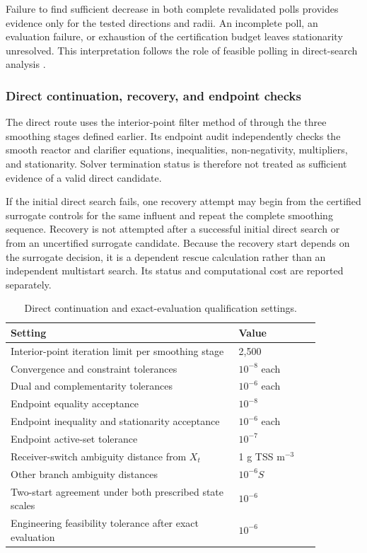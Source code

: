 Failure to find sufficient decrease in both complete revalidated polls provides evidence only for the tested directions and radii. An incomplete poll, an evaluation failure, or exhaustion of the certification budget leaves stationarity unresolved. This interpretation follows the role of feasible polling in direct-search analysis \citep{AudetDennis2006}.

\subsubsection{Direct continuation, recovery, and endpoint checks}

The direct route uses the interior-point filter method of \citet{WachterBiegler2006} through the three smoothing stages defined earlier. Its endpoint audit independently checks the smooth reactor and clarifier equations, inequalities, non-negativity, multipliers, and stationarity. Solver termination status is therefore not treated as sufficient evidence of a valid direct candidate.

If the initial direct search fails, one recovery attempt may begin from the certified surrogate controls for the same influent and repeat the complete smoothing sequence. Recovery is not attempted after a successful initial direct search or from an uncertified surrogate candidate. Because the recovery start depends on the surrogate decision, it is a dependent rescue calculation rather than an independent multistart search. Its status and computational cost are reported separately.

\begin{table}[htbp]
\centering\small
\caption{Direct continuation and exact-evaluation qualification settings.}\label{tab:plant_direct_settings}
\begin{tabular}{p{0.64\linewidth}p{0.23\linewidth}}
\toprule Setting & Value\\\midrule
Interior-point iteration limit per smoothing stage & 2{,}500\\
Convergence and constraint tolerances & $10^{-8}$ each\\
Dual and complementarity tolerances & $10^{-6}$ each\\
Endpoint equality acceptance & $10^{-8}$\\
Endpoint inequality and stationarity acceptance & $10^{-6}$ each\\
Endpoint active-set tolerance & $10^{-7}$\\
Receiver-switch ambiguity distance from $X_t$ & 1 g TSS m$^{-3}$\\
Other branch ambiguity distances & $10^{-6}S$\\
Two-start agreement under both prescribed state scales & $10^{-6}$\\
Engineering feasibility tolerance after exact evaluation & $10^{-6}$\\
\bottomrule
\end{tabular}
\end{table}

